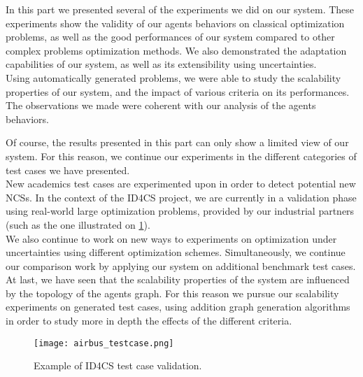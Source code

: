 In this part we presented several of the experiments we did on our system. These experiments show the validity of our agents behaviors on classical optimization problems, as well as the good performances of our system compared to other complex problems optimization methods. We also demonstrated the adaptation capabilities of our system, as well as its extensibility using uncertainties.\\
Using automatically generated problems, we were able to study the scalability properties of our system, and the impact of various criteria on its performances. The observations we made were coherent with our analysis of the agents behaviors.

Of course, the results presented in this part can only show a limited view of our system. For this reason, we continue our experiments in the different categories of test cases we have presented.\\
New academics test cases are experimented upon in order to detect potential new NCSs. In the context of the ID4CS project, we are currently in a validation phase using real-world large optimization problems, provided by our industrial partners (such as the one illustrated on \figurename{} \ref{test_case_airbus}).\\
We also continue to work on new ways to experiments on optimization under uncertainties using different optimization schemes. Simultaneously, we continue our comparison work by applying our system on additional benchmark test cases.\\
At last, we have seen that the scalability properties of the system are influenced by the topology of the agents graph. For this reason we pursue our scalability experiments on generated test cases, using addition graph generation algorithms in order to study more in depth the effects of the different criteria.

\begin{figure}[b]
\centering
\texttt{[image: airbus\_testcase.png]}
\caption{Example of ID4CS test case validation.}\label{test_case_airbus}
\end{figure}
